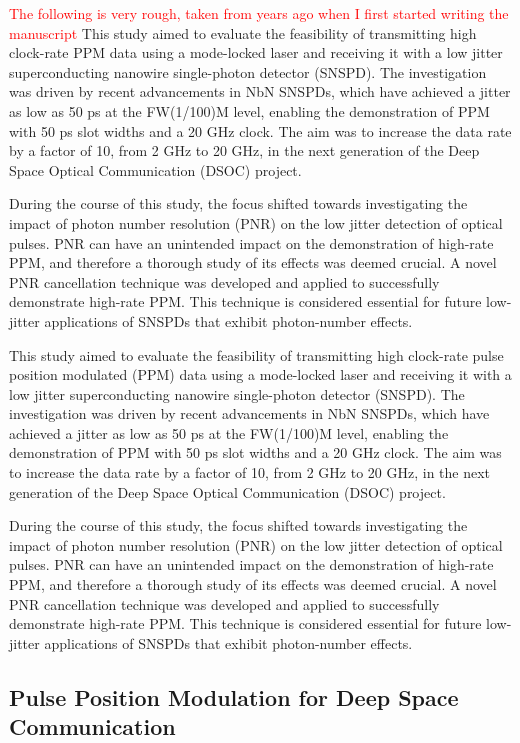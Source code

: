 \documentclass{optica-article}
\begin{document}
\textcolor{red}{ The following is very rough, taken from years ago when I first started writing the manuscript }
This study aimed to evaluate the feasibility of transmitting high clock-rate PPM data using a mode-locked laser and receiving it with a low jitter superconducting nanowire single-photon detector (SNSPD). The investigation was driven by recent advancements in NbN SNSPDs, which have achieved a jitter as low as 50 ps at the FW(1/100)M level, enabling the demonstration of PPM with 50 ps slot widths and a 20 GHz clock. The aim was to increase the data rate by a factor of 10, from 2 GHz to 20 GHz, in the next generation of the Deep Space Optical Communication (DSOC) project.

During the course of this study, the focus shifted towards investigating the impact of photon number resolution (PNR) on the low jitter detection of optical pulses. PNR can have an unintended impact on the demonstration of high-rate PPM, and therefore a thorough study of its effects was deemed crucial. A novel PNR cancellation technique was developed and applied to successfully demonstrate high-rate PPM. This technique is considered essential for future low-jitter applications of SNSPDs that exhibit photon-number effects.

This study aimed to evaluate the feasibility of transmitting high clock-rate pulse position modulated (PPM) data using a mode-locked laser and receiving it with a low jitter superconducting nanowire single-photon detector (SNSPD). The investigation was driven by recent advancements in NbN SNSPDs, which have achieved a jitter as low as 50 ps at the FW(1/100)M level, enabling the demonstration of PPM with 50 ps slot widths and a 20 GHz clock. The aim was to increase the data rate by a factor of 10, from 2 GHz to 20 GHz, in the next generation of the Deep Space Optical Communication (DSOC) project.

During the course of this study, the focus shifted towards investigating the impact of photon number resolution (PNR) on the low jitter detection of optical pulses. PNR can have an unintended impact on the demonstration of high-rate PPM, and therefore a thorough study of its effects was deemed crucial. A novel PNR cancellation technique was developed and applied to successfully demonstrate high-rate PPM. This technique is considered essential for future low-jitter applications of SNSPDs that exhibit photon-number effects.

\hypertarget{pulse-position-modulation-for-deep-space-communication}{%
\subsection{Pulse Position Modulation for Deep Space Communication}\label{pulse-position-modulation-for-deep-space-communication}}
\end{document}
